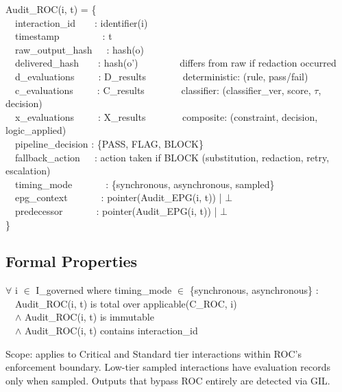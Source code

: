 \begin{cladnote}\footnotesize
Audit\_ROC(i, t) = \{\\
~~interaction\_id~~~~: identifier(i)\\
~~timestamp~~~~~~~~~: t\\
~~raw\_output\_hash~~~: hash(o)\\
~~delivered\_hash~~~~: hash(o')~~~~~~~~\textemdash{} differs from raw if redaction occurred\\
~~d\_evaluations~~~~~: D\_results~~~~~~~\textemdash{} deterministic: (rule, pass/fail)\\
~~c\_evaluations~~~~~: C\_results~~~~~~~\textemdash{} classifier: (classifier\_ver, score, $\tau$, decision)\\
~~x\_evaluations~~~~~: X\_results~~~~~~~\textemdash{} composite: (constraint, decision, logic\_applied)\\
~~pipeline\_decision : \{PASS, FLAG, BLOCK\}\\
~~fallback\_action~~~: action taken if BLOCK (substitution, redaction, retry, escalation)\\
~~timing\_mode~~~~~~~: \{synchronous, asynchronous, sampled\}\\
~~epg\_context~~~~~~~: pointer(Audit\_EPG(i, t)) | $\bot$\\
~~predecessor~~~~~~~: pointer(Audit\_EPG(i, t)) | $\bot$\\
\}
\end{cladnote}


\subsection{Formal Properties}
\label{sec:formal-model-A-2-5}


\begin{cthm}
\begin{claddisp}
$\forall$ i $\in$ I\_governed where timing\_mode $\in$ \{synchronous, asynchronous\} :\\
~~Audit\_ROC(i, t) is total over applicable(C\_ROC, i)\\
~~$\wedge$ Audit\_ROC(i, t) is immutable\\
~~$\wedge$ Audit\_ROC(i, t) contains interaction\_id\\
\end{claddisp}
Scope: applies to Critical and Standard tier interactions within ROC's enforcement boundary. Low-tier sampled interactions have evaluation records only when sampled. Outputs that bypass ROC entirely are detected via GIL.

\end{cthm}

